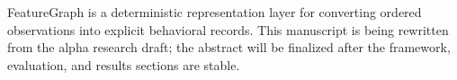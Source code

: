 FeatureGraph is a deterministic representation layer for converting ordered observations into explicit behavioral records. This manuscript is being rewritten from the alpha research draft; the abstract will be finalized after the framework, evaluation, and results sections are stable.
